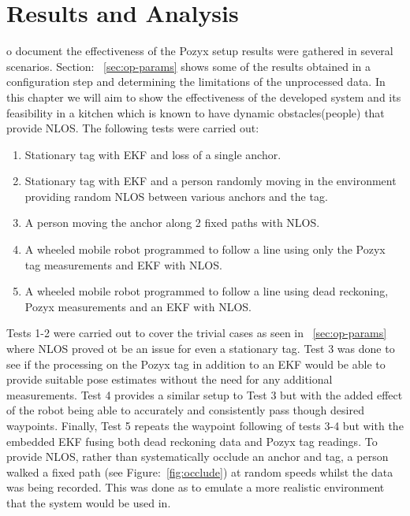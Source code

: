\chapter{Results and Analysis}\label{ch:results-and-analysis}
o document the effectiveness of the Pozyx setup results were gathered in several scenarios.
Section: ~\ref{sec:op-params} shows some of the results obtained in a configuration step and determining the limitations of the unprocessed data.
In this chapter we will aim to show the effectiveness of the developed system and its feasibility in a kitchen which is known to have dynamic obstacles(people) that provide NLOS.
The following tests were carried out:
\begin{enumerate}
    \item Stationary tag with EKF and loss of a single anchor.
    \item Stationary tag with EKF and a person randomly moving in the environment providing random NLOS between various anchors and the tag.
    \item A person moving the anchor along 2 fixed paths with NLOS.
    \item A wheeled mobile robot programmed to follow a line using only the Pozyx tag measurements and EKF with NLOS.
    \item A wheeled mobile robot programmed to follow a line using dead reckoning, Pozyx measurements and an EKF with NLOS.
\end{enumerate}


Tests 1-2 were carried out to cover the trivial cases as seen in ~\ref{sec:op-params} where NLOS proved ot be an issue for even a stationary tag.
Test 3 was done to see if the processing on the Pozyx tag in addition to an EKF would be able to provide suitable pose estimates without the need for any additional measurements.
Test 4 provides a similar setup to Test 3 but with the added effect of the robot being able to accurately and consistently pass though desired waypoints.
Finally, Test 5 repeats the waypoint following of tests 3-4 but with the embedded EKF fusing both dead reckoning data and Pozyx tag readings.
To provide NLOS, rather than systematically occlude an anchor and tag, a person walked a fixed path (see Figure:~\ref{fig:occlude}) at random speeds whilst the data was being recorded.
This was done as to emulate a more realistic environment that the system would be used in.

